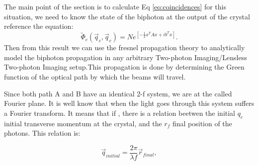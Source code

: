 The main point of the section is to calculate Eq \ref{eq:coincidences} 
for this situation, we need to know 
the state of the biphoton at the output of the crystal reference the equation:
\begin{equation}
\label{eq:crystal}
\tilde{\Phi}_c(\vec{q}_c,\vec{q}_c)=N e^{\left[ -\frac{1}{2}x^T A x + i b^T x \right]}.
\end{equation}
Then from this result we can use the fresnel propagation theory to analytically model the biphoton 
propagation in any arbitrary Two-photon Imaging/Lensless Two-photon Imaging setup.This propagation is done 
by determining the Green function of the optical path by which the beams will travel\cite{green}.



 
Since both path A and B have an identical 2-f system, we are at the called Fourier plane. It is 
well know that when the light goes through this system suffers a Fourier transform\cite{introquantumoptics}. It means that if 
, there is a relation beetwen
the initial $q_c$ initial transverse momentum at the crystal, and the $r_f$ final position of 
the photons. This relation is:



\begin{equation}\label{eq:fourier}
\vec{q}_{initial}=\frac{2 \pi}{\lambda f} \vec{r}_{final},
\end{equation}



